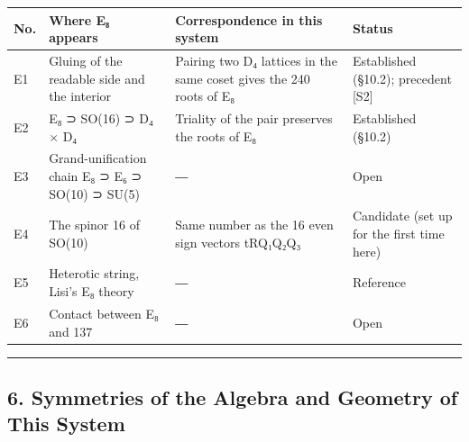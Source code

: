 \documentclass[
  a4paper,
]{article}
\newcounter{none} %
\begin{document}
{\def\LTcaptype{none} %
\begin{longtable}[]{@{}
  >{\raggedright\arraybackslash}p{}
  >{\raggedright\arraybackslash}p{}
  >{\raggedright\arraybackslash}p{}
  >{\raggedright\arraybackslash}p{}@{}}
\toprule\noalign{}
\begin{minipage}[b]{\linewidth}\raggedright
No.
\end{minipage} & \begin{minipage}[b]{\linewidth}\raggedright
Where E₈ appears
\end{minipage} & \begin{minipage}[b]{\linewidth}\raggedright
Correspondence in this system
\end{minipage} & \begin{minipage}[b]{\linewidth}\raggedright
Status
\end{minipage} \\
\midrule\noalign{}
\endhead
\bottomrule\noalign{}
\endlastfoot
E1 & Gluing of the readable side and the interior & Pairing two D₄
lattices in the same coset gives the 240 roots of E₈ & Established
(§10.2); precedent {[}S2{]} \\
E2 & E₈ ⊃ SO(16) ⊃ D₄ × D₄ & Triality of the pair preserves the roots of
E₈ & Established (§10.2) \\
E3 & Grand-unification chain E₈ ⊃ E₆ ⊃ SO(10) ⊃ SU(5) & ― & Open \\
E4 & The spinor 16 of SO(10) & Same number as the 16 even sign vectors
tRQ₁Q₂Q₃ & Candidate (set up for the first time here) \\
E5 & Heterotic string, Lisi's E₈ theory & ― & Reference \\
E6 & Contact between E₈ and 137 & ― & Open \\
\end{longtable}
}

\begin{center}\rule{0.5\linewidth}{0.5pt}\end{center}

\subsection{6. Symmetries of the Algebra and Geometry of This
System}\label{symmetries-of-the-algebra-and-geometry-of-this-system}
\end{document}
